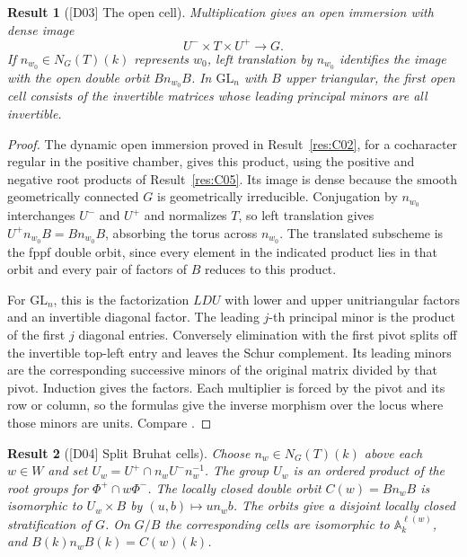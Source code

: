 \documentclass[11pt,a4paper,openany,oneside]{book}
\theoremstyle{resultstyle}
\newtheorem{statement}{Result}[chapter]
\newenvironment{result}[2]{\clubpenalty=10000\begin{statement}[\textnormal{[#1]} #2]\leavevmode\label{res:#1}\ignorespaces}{\end{statement}}
\theoremstyle{definition}
\numberwithin{equation}{chapter}
\newcommand{\GL}{\mathrm{GL}}
\begin{document}
\begin{result}{D03}{The open cell}
Multiplication gives an open immersion with dense image
\[
  U^- \times T\times U^+\longrightarrow G.
\]
If \(n_{w_0}\in N_G(T)(k)\) represents \(w_0\), left translation by \(n_{w_0}\) identifies the image with the open double orbit \(Bn_{w_0}B\). In \(\GL_n\) with \(B\) upper triangular, the first open cell consists of the invertible matrices whose leading principal minors are all invertible.
\end{result}

\begin{proof}
The dynamic open immersion proved in Result~\ref{res:C02},
for a cocharacter regular in the positive chamber, gives this
product, using the positive and negative root products of
Result~\ref{res:C05}. Its image is dense because the smooth
geometrically connected \(G\) is geometrically irreducible.
Conjugation by \(n_{w_0}\) interchanges \(U^-\) and \(U^+\)
and normalizes \(T\), so left translation gives
\(U^+n_{w_0}B=Bn_{w_0}B\), absorbing the torus across \(n_{w_0}\).
The translated subscheme is the fppf double orbit, since every
element in the indicated product lies in that orbit and every
pair of factors of \(B\) reduces to this product.

For \(\GL_n\), this is the factorization \(LDU\) with lower and
upper unitriangular factors and an invertible diagonal factor.
The leading \(j\)-th principal minor is the product of the first
\(j\) diagonal entries. Conversely elimination with the first
pivot splits off the invertible top-left entry and leaves the
Schur complement. Its leading minors are the corresponding
successive minors of the original matrix divided by that pivot.
Induction gives the factors. Each multiplier is forced by
the pivot and its row or column, so the formulas give the inverse
morphism over the locus where those minors are units.
Compare \cite[Theorem 21.84 and Example 21.87]{milne}.
\end{proof}

\begin{result}{D04}{Split Bruhat cells}
Choose \(n_w\in N_G(T)(k)\) above each \(w\in W\) and set \(U_w=U^+\cap n_wU^-n_w^{-1}\). The group \(U_w\) is an ordered product of the root groups for \(\Phi^+\cap w\Phi^-\). The locally closed double orbit \(C(w)=Bn_wB\) is isomorphic to \(U_w\times B\) by \((u,b)\mapsto un_wb\). The orbits give a disjoint locally closed stratification of \(G\). On \(G/B\) the corresponding cells are isomorphic to \(\mathbb A^{\ell(w)}_k\), and \(B(k)n_wB(k)=C(w)(k)\).
\end{result}
\end{document}
